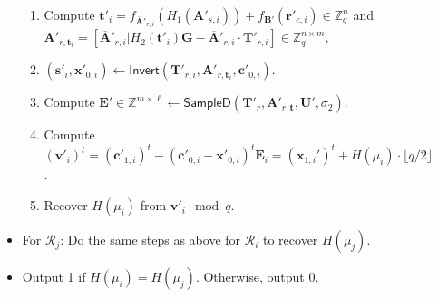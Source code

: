 \documentclass[a4paper,11pt,onecolumn]{elsarticle}
\begin{document}
\begin{description}
\begin{itemize}
\begin{enumerate}
					\item Compute  $\textbf{t}'_i=f_{\overline{\textbf{A}}'_{r,i}}(H_1(\textbf{A}'_{s,i}))+f_{\textbf{B}'}(\textbf{r}'_{e,i})\in \mathbb{Z}_q^{n}$ and  $\textbf{A}'_{r,\textbf{t}_i}=[\overline{\mathbf{A}}'_{r,i}|H_2(\textbf{t}'_i)\mathbf{G}-\overline{\mathbf{A}}'_{r,i}\cdot \mathbf{T}'_{r,i}]\in \mathbb{Z}_q^{n \times m}$,
					\item $(\textbf{s}'_i,\textbf{x}'_{0, i}) \leftarrow \textsf{Invert}(\textbf{T}'_{r,i},\textbf{A}'_{r,\textbf{t}_i}, \textbf{c}'_{0,i})$.
					\item 
					
					Compute $\textbf{E}' \in \mathbb{Z}^{m\times \ell} \leftarrow \textsf{SampleD}(\textbf{T}'_r, \textbf{A}'_{r,\textbf{t}},\textbf{U}',\sigma_2)$.
					\item Compute $(\textbf{v}'_{i})^t=(\textbf{c}'_{1,i})^t-(\textbf{c}'_{0,i}-\textbf{x}'_{0,i})^t\textbf{E}_i= (\textbf{x}_{1,i}')^t+H(\mu_i)\cdot \lfloor q/2\rfloor $.
					\item Recover $H(\mu_i)$ from $\textbf{v}'_i\!\! \mod q$.	
				\end{enumerate}
				\item For $\mathcal{R}_j$: Do the same steps as above for $\mathcal{R}_i$ to recover $H(\mu_j)$.
				\item  Output 1 if  $H(\mu_i)=H(\mu_j)$. Otherwise, output $0$.
		\end{itemize}
	\end{description}
	
	
	
	
	
\end{document}
